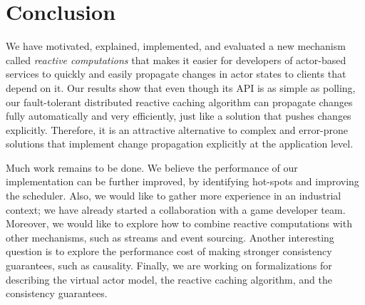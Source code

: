 \section{Conclusion}

We have motivated, explained, implemented, and evaluated a new mechanism called \emph{reactive computations} that makes it easier for developers of actor-based services to quickly and easily propagate changes in actor states to clients that depend on it. Our results show that even though its API is as simple as polling, our fault-tolerant distributed reactive caching algorithm can propagate changes fully automatically and very efficiently, just like a solution that pushes changes explicitly. Therefore, it is an attractive alternative to complex and error-prone solutions that implement change propagation explicitly at the application level. 

Much work remains to be done. We believe the performance of our implementation can be further improved, by identifying hot-spots and improving the scheduler. Also, we would like to gather more experience in an industrial context; we have already started a collaboration with a game developer team. Moreover, we would like to explore how to combine reactive computations with other mechanisms, such as streams and event sourcing. Another interesting question is to explore the performance cost of making stronger consistency guarantees, such as causality. Finally, we are working on formalizations for describing the virtual actor model, the reactive caching algorithm, and the consistency guarantees.